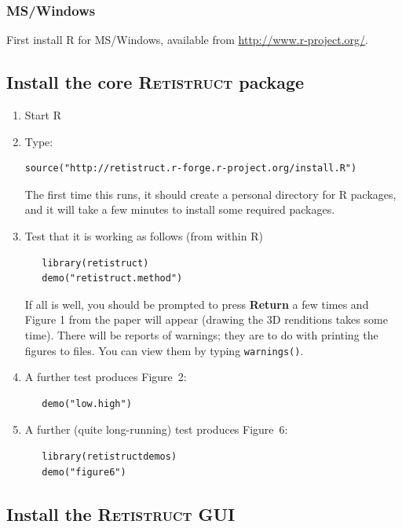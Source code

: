 \documentclass{article}
\begin{document}
\subsubsection{MS/Windows}

First install R for MS/Windows, available from \url{http://www.r-project.org/}.

\subsection{Install the core \textsc{Retistruct} package}

\begin{enumerate}
\item Start \textsc{R}
 \item  Type:
\begin{verbatim}
source("http://retistruct.r-forge.r-project.org/install.R")
\end{verbatim}
   The first time this runs, it should create a personal directory for
   R packages, and it will take a few minutes to install some required
   packages.
 \item Test that it is working as follows (from within R)
\begin{verbatim}
   library(retistruct)
   demo("retistruct.method")
\end{verbatim}
   If all is well, you should be prompted to press \textbf{Return} a
   few times and Figure 1 from the paper \cite{SterrattEtal2012} will
   appear (drawing the 3D renditions takes some time). There will be
   reports of warnings; they are to do with printing the figures to
   files. You can view them by typing \texttt{warnings()}.
 \item A further test produces Figure~2:
\begin{verbatim}
   demo("low.high")
\end{verbatim}
 \item A further (quite long-running) test produces Figure~6:
\begin{verbatim}
   library(retistructdemos)
   demo("figure6")
\end{verbatim}
\end{enumerate}

\subsection{Install the \textsc{Retistruct} GUI}
\label{retistruct-manual:sec:inst-retistr-gui}
\end{document}
